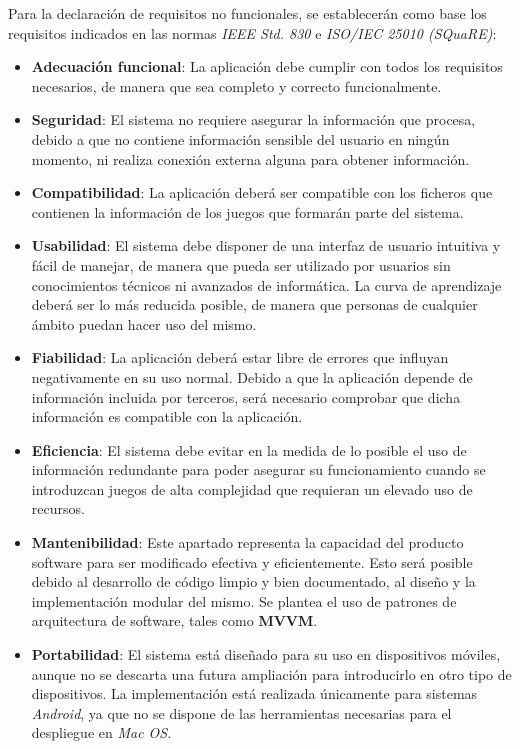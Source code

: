 Para la declaración de requisitos no funcionales, se establecerán como base los 
requisitos indicados en las normas \textit{IEEE Std. 830} e \textit{ISO/IEC 25010 (SQuaRE)}:

\begin{itemize}   
    \item \textbf{Adecuación funcional}: La aplicación debe cumplir con todos los requisitos necesarios, 
    de manera que sea completo y correcto funcionalmente.

    \item \textbf{Seguridad}: El sistema no requiere asegurar la información que procesa, debido a que 
    no contiene información sensible del usuario en ningún momento, ni realiza conexión externa alguna 
    para obtener información.
    
    \item \textbf{Compatibilidad}: La aplicación deberá ser compatible con los ficheros que contienen
    la información de los juegos que formarán parte del sistema.
    
    \item \textbf{Usabilidad}: El sistema debe disponer de una interfaz de usuario intuitiva y fácil de 
    manejar, de manera que pueda ser utilizado por usuarios sin conocimientos técnicos ni avanzados de 
    informática. La curva de aprendizaje deberá ser lo más reducida posible, de manera que personas de 
    cualquier ámbito puedan hacer uso del mismo.

    \item \textbf{Fiabilidad}: La aplicación deberá estar libre de errores que influyan negativamente 
    en su uso normal. Debido a que la aplicación depende de información incluida por terceros, será 
    necesario comprobar que dicha información es compatible con la aplicación.
    
    \item \textbf{Eficiencia}: El sistema debe evitar en la medida de lo posible el uso de información 
    redundante para poder asegurar su funcionamiento cuando se introduzcan juegos de alta complejidad 
    que requieran un elevado uso de recursos.

    \item \textbf{Mantenibilidad}: Este apartado representa la capacidad del producto software para 
    ser modificado efectiva y eficientemente. Esto será posible debido al desarrollo de código 
    limpio y bien documentado, al diseño y la implementación modular del mismo. Se plantea el uso 
    de patrones de arquitectura de software, tales como \textbf{MVVM}.

    \item \textbf{Portabilidad}: El sistema está diseñado para su uso en dispositivos móviles, 
    aunque no se descarta una futura ampliación para introducirlo en otro tipo de dispositivos.
    La implementación está realizada únicamente para sistemas \textit{Android}, ya que no 
    se dispone de las herramientas necesarias para el despliegue en \textit{Mac OS}. 
\end{itemize}
